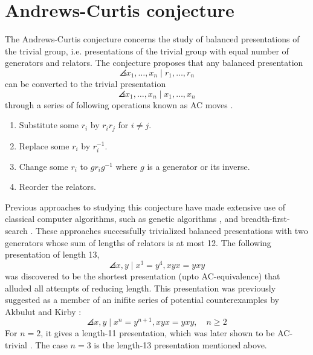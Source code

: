 
\section{Andrews-Curtis conjecture\label{sec:AC}}

The Andrews-Curtis conjecture concerns the study of balanced presentations of the trivial group, i.e. presentations of the trivial group with equal number of generators and relators. The conjecture proposes that any balanced presentation 
\[
\angles{x_1, \dots, x_n \mid r_1, \dots, r_n}
\]
can be converted to the trivial presentation
\[
\angles{x_1, \dots, x_n \mid x_1, \dots, x_n}
\]
through a series of following operations known as AC moves \cite{Andrews-Curtis}.

\begin{enumerate}
	\item Substitute some $r_i$ by $r_i r_j$ for $i \neq j$.
	\item Replace some $r_i$ by $r_i^{-1}$.
	\item Change some $r_i$ to $g r_i g^{-1}$ where $g$ is a generator or its inverse.
	\item Reorder the relators.
\end{enumerate}

Previous approaches to studying this conjecture have made extensive use of classical computer algorithms, such as genetic algorithms \cite{genetic}, and breadth-first-search  \cite{bfs-ac}. These approaches successfully trivialized balanced presentations with two generators whose sum of lengths of relators is at most 12. The following presentation of length 13,
\[
\angles{x, y \mid x^3 = y^4, xyx = yxy}
\]
was discovered to be the shortest presentation (upto AC-equivalence) that alluded all attempts of reducing length. This presentation was previously suggested as a member of an inifite series of potential counterexamples by Akbulut and Kirby \cite{Akbulut-Kirby}:
\[
\angles{x, y \mid x^n = y^{n+1}, xyx = yxy}, \quad n \geq 2
\]
For $n=2$, it gives a length-11 presentation, which was later shown to be AC-trivial \cite{genetic}. The case $n=3$ is the length-13 presentation mentioned above. 
\newline

